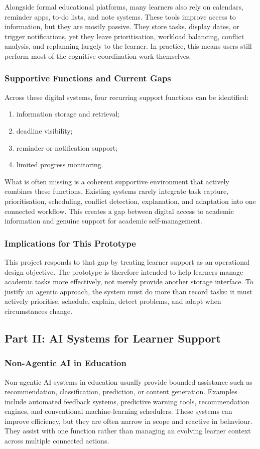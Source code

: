 \documentclass[12pt]{article}
\begin{document}
Alongside formal educational platforms, many learners also rely on calendars, reminder apps, to-do lists, and note systems. These tools improve access to information, but they are mostly passive. They store tasks, display dates, or trigger notifications, yet they leave prioritisation, workload balancing, conflict analysis, and replanning largely to the learner. In practice, this means users still perform most of the cognitive coordination work themselves.

\subsubsection{Supportive Functions and Current Gaps}
Across these digital systems, four recurring support functions can be identified:
\begin{enumerate}
    \item information storage and retrieval;
    \item deadline visibility;
    \item reminder or notification support;
    \item limited progress monitoring.
\end{enumerate}

What is often missing is a coherent supportive environment that actively combines these functions. Existing systems rarely integrate task capture, prioritisation, scheduling, conflict detection, explanation, and adaptation into one connected workflow. This creates a gap between digital access to academic information and genuine support for academic self-management.

\subsubsection{Implications for This Prototype}
This project responds to that gap by treating learner support as an operational design objective. The prototype is therefore intended to help learners manage academic tasks more effectively, not merely provide another storage interface. To justify an agentic approach, the system must do more than record tasks: it must actively prioritise, schedule, explain, detect problems, and adapt when circumstances change.

\subsection{Part II: AI Systems for Learner Support}
\subsubsection{Non-Agentic AI in Education}
Non-agentic AI systems in education usually provide bounded assistance such as recommendation, classification, prediction, or content generation. Examples include automated feedback systems, predictive warning tools, recommendation engines, and conventional machine-learning schedulers. These systems can improve efficiency, but they are often narrow in scope and reactive in behaviour. They assist with one function rather than managing an evolving learner context across multiple connected actions.
\end{document}
